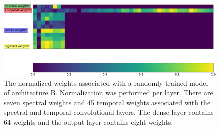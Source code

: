 \documentclass{article}
\begin{document}
\begin{figure}
\includegraphics[width=1.0\textwidth]{weights-crop.pdf} 
\caption{The normalized weights associated with a randomly trained model of architecture B. Normalization was performed per layer. There are seven spectral weights and 45 temporal weights associated with the spectral and temporal convolutional layers. The dense layer contains 64 weights and the output layer contains eight weights.}
\label{fig:weights}

\end{figure}

\end{document}

